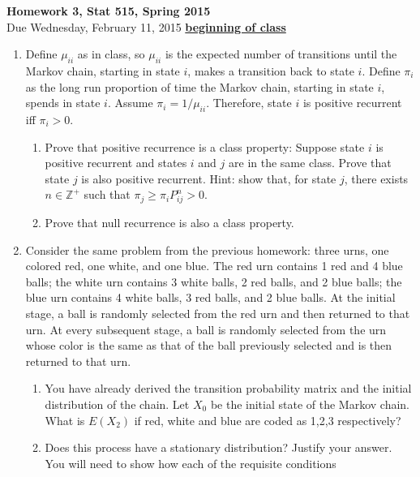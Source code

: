 \documentclass{article}
\begin{document}
\begin{center}
\Large
{\bf Homework 3, Stat 515, Spring 2015}\\
\normalsize
Due Wednesday, February 11, 2015 \underline{{\bf beginning of class}}\\
\end{center}
\begin{enumerate}%
\item Define $\mu_{ii}$ as in class, so $\mu_{ii}$ is the expected
  number of transitions until the Markov chain, starting in state $i$,
  makes a transition back to state $i$. Define $\pi_i$ as the long run
  proportion of time the Markov chain, starting in state $i$, spends
  in state $i$. Assume $\pi_i = 1/\mu_{ii}$. Therefore, state $i$ is
  positive recurrent iff $\pi_i>0$. 
\begin{enumerate}
\item Prove that positive recurrence is a class property: Suppose
  state $i$ is positive recurrent and states $i$ and $j$ are in the
  same class.  Prove that state $j$ is also positive recurrent.  Hint:
  show that, for state $j$, there exists $n\in \mathbb{Z}^+$ such that
  $\pi_j \geq \pi_i P_{ij}^n > 0$.
\item Prove that null recurrence is also a class property.
\end{enumerate}
\item Consider the same problem from the previous homework: three
  urns, one colored red, one white, and one blue.  The red urn
  contains 1 red and 4 blue balls; the white urn contains 3 white
  balls, 2 red balls, and 2 blue balls; the blue urn contains 4 white
  balls, 3 red balls, and 2 blue balls.  At the initial stage, a ball
  is randomly selected from the red urn and then returned to that
  urn. At every subsequent stage, a ball is randomly selected from the
  urn whose color is the same as that of the ball previously selected
  and is then returned to that urn.
\begin{enumerate}
\item You have already derived the transition probability matrix and
  the initial distribution of the chain. Let $X_0$ be the initial
  state of the Markov chain. What is $E(X_2)$ if red, white and blue
  are coded as 1,2,3 respectively?
\item Does this process have a stationary distribution? Justify your
  answer. You will need to show how each of the requisite conditions

\end{enumerate}
\end{enumerate}
\end{document}
